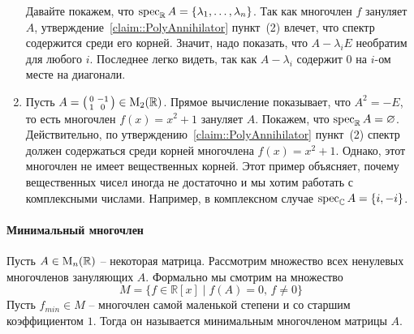 \begin{enumerate}
Давайте покажем, что $\operatorname{spec}_\mathbb R A = \{\lambda_1,\ldots, \lambda_n\}$.
Так как многочлен $f$ зануляет $A$, утверждение~\ref{claim::PolyAnnihilator} пункт~(2) влечет, что спектр содержится среди его корней.
Значит, надо показать, что $A-\lambda_i E$ необратим для любого $i$.
Последнее легко видеть, так как $A-\lambda_i$ содержит $0$ на $i$-ом месте на диагонали.

\item Пусть $A=\left(\begin{smallmatrix}{0}&{-1}\\{1}&{0}\end{smallmatrix}\right)\in\operatorname{M}_{2}(\mathbb R)$.
Прямое вычисление показывает, что $A^2 = -E$, то есть многочлен $f(x) = x^2 + 1$ зануляет $A$.
Покажем, что $\operatorname{spec}_\mathbb R A = \varnothing$.
Действительно, по утверждению~\ref{claim::PolyAnnihilator} пункт~(2) спектр должен содержаться среди корней многочлена $f(x) = x^2 + 1$.
Однако, этот многочлен не имеет вещественных корней.
Этот пример объясняет, почему вещественных чисел иногда не достаточно и мы хотим работать с комплексными числами.
Например, в комплексном случае $\operatorname{spec}_\mathbb C A = \{i, - i\}$.
\end{enumerate}

\paragraph{Минимальный многочлен}

Пусть $A\in\operatorname{M}_{n}(\mathbb R)$ -- некоторая матрица.
Рассмотрим множество всех ненулевых многочленов зануляющих $A$.
Формально мы смотрим на множество
\[
M = \{f\in\mathbb R[x]\mid f(A)=0,\,f\neq 0\}
\]
Пусть $f_{min}\in M$ -- многочлен самой маленькой степени и со старшим коэффициентом $1$.
Тогда он называется минимальным многочленом матрицы $A$.

